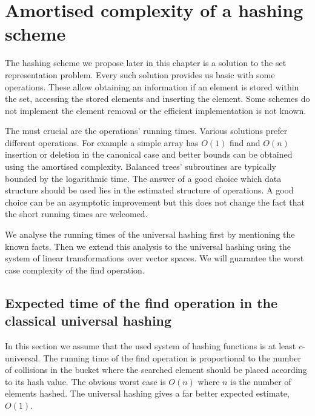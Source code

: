 \chapter{Amortised complexity of a hashing scheme}

The hashing scheme we propose later in this chapter is a solution to the set representation problem. Every such solution provides us basic with some operations. These allow obtaining an information if an element is stored within the set, accessing the stored elements and inserting the element. Some schemes do not implement the element removal or the efficient implementation is not known.

The must crucial are the operations' running times. Various solutions prefer different operations. For example a simple array has $O(1)$ find and $O(n)$ insertion or deletion in the canonical case and better bounds can be obtained using the amortised complexity. Balanced trees' subroutines are typically bounded by the logarithmic time. The answer of a good choice which data structure should be used lies in the estimated structure of operations. A good choice can be an asymptotic improvement but this does not change the fact that the short running times are welcomed.

We analyse the running times of the universal hashing first by mentioning the known facts. Then we extend this analysis to the universal hashing using the system of linear transformations over vector spaces. We will guarantee the worst case complexity of the find operation.

\section{Expected time of the find operation in the classical universal hashing}
In this section we assume that the used system of hashing functions is at least $c$-universal. The running time of the find operation is proportional to the number of collisions in the bucket where the searched element should be placed according to its hash value. The obvious worst case is $O(n)$ where $n$ is the number of elements hashed. The universal hashing gives a far better expected estimate, $O(1)$.

